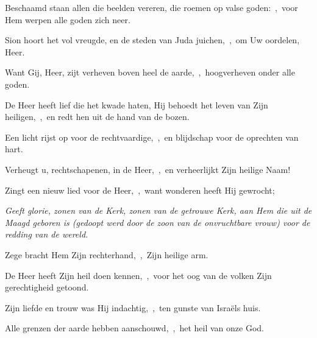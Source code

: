 \documentclass[12pt,twoside,a5paper]{article}
\begin{document}

\begin{halfparskip}
  Beschaamd staan allen die beelden vereren, die roemen op valse goden:~\sep\ voor Hem werpen alle goden zich neer.

  Sion hoort het vol vreugde, en de steden van Juda juichen,~\sep\ om Uw oordelen, Heer.

  Want Gij, Heer, zijt verheven boven heel de aarde,~\sep\ hoogverheven onder alle goden.

  De Heer heeft lief die het kwade haten, Hij behoedt het leven van Zijn heiligen,~\sep\ en redt hen uit de hand van de bozen.

  Een licht rijst op voor de rechtvaardige,~\sep\ en blijdschap voor de oprechten van hart.

  Verheugt u, rechtschapenen, in de Heer,~\sep\ en verheerlijkt Zijn heilige Naam!
\end{halfparskip}



\begin{halfparskip}
  Zingt een nieuw lied voor de Heer,~\sep\ want wonderen heeft Hij gewrocht;


   \emph{Geeft glorie, zonen van de Kerk, zonen van de getrouwe Kerk, aan Hem die uit de Maagd geboren is (gedoopt werd door de zoon van de onvruchtbare vrouw) voor de redding van de wereld.}

  Zege bracht Hem Zijn rechterhand,~\sep\ Zijn heilige arm.

  De Heer heeft Zijn heil doen kennen,~\sep\ voor het oog van de volken Zijn gerechtigheid getoond.

  Zijn liefde en trouw was Hij indachtig,~\sep\ ten gunste van Israëls huis.

  Alle grenzen der aarde hebben aanschouwd,~\sep\ het heil van onze God.
\end{halfparskip}

\end{document}
